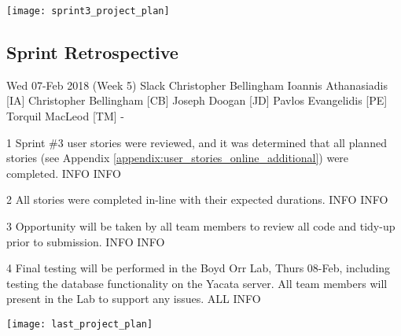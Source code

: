 \begin{center}
	\texttt{[image: sprint3\_project\_plan]}
	\label{figure:sprint3_project_plan}
\end{center}


\newpage
\subsection{Sprint Retrospective}
\label{appendix:final_sprint_meeting}

\momtoptable
{Wed 07-Feb 2018 (Week 5)}
{Slack}
{Christopher Bellingham}
{Ioannis Athanasiadis [IA]\newline
Christopher Bellingham [CB]\newline
Joseph Doogan [JD]\newline
Pavlos Evangelidis [PE]\newline
Torquil MacLeod [TM]}
{-}

\begin{momitems}
	\momitem
	{1}
	{Sprint \#3 user stories were reviewed, and it was determined that all planned stories (see Appendix \ref{appendix:user_stories_online_additional}) were completed.}
	{INFO}
	{INFO}

	\momitem
	{2}
	{All stories were completed in-line with their expected durations.}
	{INFO}
	{INFO}
	
	\momitem
	{3}
	{Opportunity will be taken by all team members to review all code and tidy-up prior to submission.}
	{INFO}
	{INFO}

	\momitem
	{4}
	{Final testing will be performed in the Boyd Orr Lab, Thurs 08-Feb, including testing the database functionality on the Yacata server.
	All team members will present in the Lab to support any issues.}
	{ALL}
	{INFO}
\end{momitems}

\begin{center}
	\texttt{[image: last\_project\_plan]}
	\label{figure:final_project_plan}
\end{center}